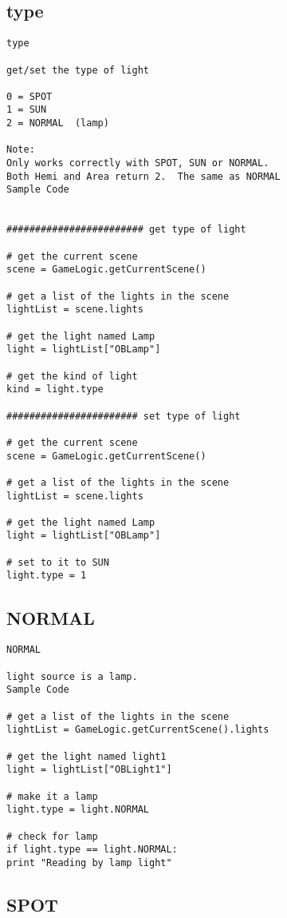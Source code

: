 \subsection{type}
\begin{verbatim}
type

get/set the type of light

0 = SPOT
1 = SUN
2 = NORMAL  (lamp)

Note:
Only works correctly with SPOT, SUN or NORMAL.
Both Hemi and Area return 2.  The same as NORMAL
Sample Code


######################## get type of light

# get the current scene
scene = GameLogic.getCurrentScene()

# get a list of the lights in the scene
lightList = scene.lights

# get the light named Lamp
light = lightList["OBLamp"]

# get the kind of light
kind = light.type

####################### set type of light

# get the current scene
scene = GameLogic.getCurrentScene()

# get a list of the lights in the scene
lightList = scene.lights

# get the light named Lamp
light = lightList["OBLamp"]

# set to it to SUN
light.type = 1
\end{verbatim}


\subsection{NORMAL}
\begin{verbatim}
NORMAL

light source is a lamp.
Sample Code

# get a list of the lights in the scene
lightList = GameLogic.getCurrentScene().lights

# get the light named light1
light = lightList["OBLight1"]

# make it a lamp
light.type = light.NORMAL

# check for lamp
if light.type == light.NORMAL:
print "Reading by lamp light"
\end{verbatim}


\subsection{SPOT}

